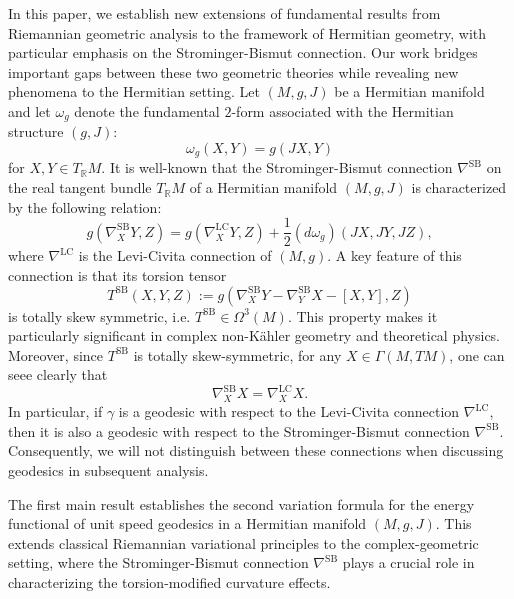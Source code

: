 \documentclass[12pt, reqno]{amsart}
\theoremstyle{plain}
\theoremstyle{definition}
\newcommand{\beq}{\begin{equation}}
\newcommand{\eeq}{\end{equation}}
\newcommand{\Om}{\Omega}
\renewcommand{\>}{\rightarrow}
\newcommand{\R}{{\mathbb R}}
\newcommand{\MS}{\mathrm{SB}}
\newcommand{\MLC}{\mathrm{LC}}
\renewcommand{\>}{\rightarrow}
\numberwithin{equation}{section} %
\begin{document}
    In this paper, we establish new extensions of fundamental results from Riemannian geometric analysis to the framework of Hermitian geometry, with particular emphasis on the Strominger-Bismut connection. Our work bridges important gaps between these two geometric theories while revealing new phenomena  to the Hermitian setting.  Let $(M,g, J)$ be a Hermitian manifold and let $\omega_g$ denote the fundamental
    $2$-form associated with the Hermitian structure $(g, J)$:
    $$ \omega_g(X,Y)=g(JX,Y)$$
    for $X, Y\in T_\R M$.  It is well-known that the Strominger-Bismut connection $\nabla^{\mathrm{SB}}$ on the real tangent bundle $T_{\mathbb{R}}M$ of a Hermitian manifold $(M,g,J)$ is characterized by the following relation:
     \beq
    g(\nabla_X^{\MS}Y,Z)=g(\nabla_X^{\MLC}Y,Z)+\frac{1}{2}\left(d\omega_g\right)(JX,JY,JZ), \label{defnSB}
    \eeq
 where $\nabla^{\MLC}$ is the Levi-Civita connection of $(M,g)$.  A key feature of this connection is that its torsion tensor   \beq  T^{\MS}(X,Y,Z):=g(\nabla^\MS_XY-\nabla^\MS_YX-[X,Y],Z)\label{torsion}\eeq
   is totally skew symmetric, i.e. $T^\MS \in \Om^3(M)$. This property makes it particularly significant in complex non-K\"ahler geometry and theoretical physics. Moreover, since $T^\MS$ is totally skew-symmetric,  for any $X\in\Gamma(M,TM)$,  one can seee clearly that
   \beq
   \nabla^{\text{SB}}_XX=\nabla^{\text{LC}}_XX.
   \eeq
   In particular, if $\gamma$ is a geodesic  with respect to the Levi-Civita connection $\nabla^{\text{LC}}$, then it is also a geodesic with respect to the Strominger-Bismut connection $\nabla^{\mathrm{SB}}$. Consequently, we will not distinguish between these connections when discussing geodesics in subsequent analysis. 


   The first main result establishes the second variation formula for the energy functional of unit speed geodesics in a Hermitian manifold $(M, g, J)$. This extends classical Riemannian variational principles to the complex-geometric setting, where the Strominger-Bismut connection  $\nabla^{\MS}$
   plays a crucial role in characterizing the torsion-modified curvature effects.
\end{document}
